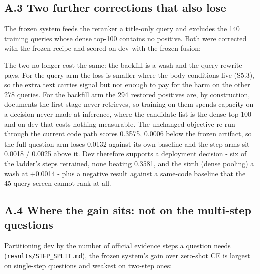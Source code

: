 \documentclass[11pt]{article}
\begin{document}
\subsection*{A.3 Two further corrections that also lose}
The frozen system feeds the reranker a title-only query and excludes the 140 training queries whose dense top-100 contains no positive. Both were corrected with the frozen recipe and scored on dev with the frozen fusion:

\begin{table}[t]
\centering
\footnotesize
{}%
\end{table}

The two no longer cost the same: the backfill is a wash and the query rewrite pays. For the query arm the loss is smaller where the body conditions live (S5.3), so the extra text carries signal but not enough to pay for the harm on the other 278 queries. For the backfill arm the 294 restored positives are, by construction, documents the first stage never retrieves, so training on them spends capacity on a decision never made at inference, where the candidate list is the dense top-100 - and on dev that costs nothing measurable. The unchanged objective re-run through the current code path scores 0.3575, 0.0006 below the frozen artifact, so the full-question arm loses 0.0132 against its own baseline and the step arms sit 0.0018 / 0.0025 above it. Dev therefore supports a deployment decision - six of the ladder’s steps retrained, none beating 0.3581, and the sixth (dense pooling) a wash at +0.0014 - plus a negative result against a same-code baseline that the 45-query screen cannot rank at all.

\subsection*{A.4 Where the gain sits: not on the multi-step questions}
Partitioning dev by the number of official evidence steps a question needs (\texttt{results/STEP\_SPLIT.md}), the frozen system’s gain over zero-shot CE is largest on single-step questions and weakest on two-step ones:
\end{document}
